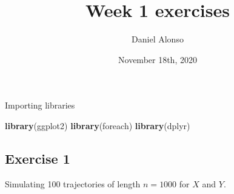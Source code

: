 \documentclass[]{article}
\title{Week 1 exercises}
\author{Daniel Alonso}
\date{November 18th, 2020}
\newenvironment{Shaded}{\begin{snugshade}}{\end{snugshade}}
\newcommand{\KeywordTok}[1]{\textcolor[rgb]{0.13,0.29,0.53}{\textbf{#1}}}
\newcommand{\NormalTok}[1]{#1}
\begin{document}
\maketitle

Importing libraries

\begin{Shaded}
\begin{Highlighting}[]
\KeywordTok{library}\NormalTok{(ggplot2)}
\KeywordTok{library}\NormalTok{(foreach)}
\KeywordTok{library}\NormalTok{(dplyr)}
\end{Highlighting}
\end{Shaded}

\hypertarget{exercise-1}{%
\subsection{Exercise 1}\label{exercise-1}}

Simulating 100 trajectories of length \(n = 1000\) for \(X\) and \(Y\).
\end{document}
